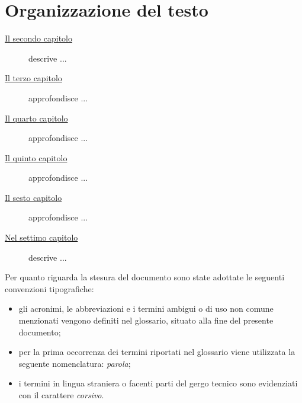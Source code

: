 \section{Organizzazione del testo}

\begin{description}
    \item[{\hyperref[cap:processi-metodologie]{Il secondo capitolo}}] descrive ...
    
    \item[{\hyperref[cap:descrizione-stage]{Il terzo capitolo}}] approfondisce ...
    
    \item[{\hyperref[cap:analisi-requisiti]{Il quarto capitolo}}] approfondisce ...
    
    \item[{\hyperref[cap:progettazione-codifica]{Il quinto capitolo}}] approfondisce ...
    
    \item[{\hyperref[cap:verifica-validazione]{Il sesto capitolo}}] approfondisce ...
    
    \item[{\hyperref[cap:conclusioni]{Nel settimo capitolo}}] descrive ...
\end{description}

Per quanto riguarda la stesura del documento sono state adottate le seguenti convenzioni tipografiche:
\begin{itemize}
	\item gli acronimi, le abbreviazioni e i termini ambigui o di uso non comune menzionati vengono definiti nel glossario, situato alla fine del presente documento;
	\item per la prima occorrenza dei termini riportati nel glossario viene utilizzata la seguente nomenclatura: \emph{parola}\glsfirstoccur;
	\item i termini in lingua straniera o facenti parti del gergo tecnico sono evidenziati con il carattere \emph{corsivo}.
\end{itemize}
